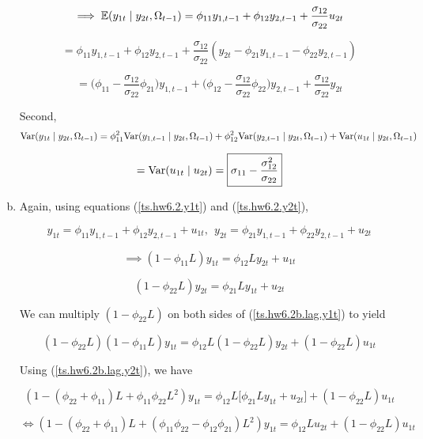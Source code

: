 \begin{enumerate}[(a)]
\[
\implies \mathbb{E}(y_{1t} \mid y_{2t}, \Omega_{t-1})  =  \phi_{11} y_{1,t-1} + \phi_{12} y_{2, t-1} + \frac{\sigma_{12}}{\sigma_{22}} u_{2t}
\]

\[
=  \phi_{11} y_{1,t-1} + \phi_{12} y_{2, t-1} + \frac{\sigma_{12}}{\sigma_{22}}( y_{2t} - \phi_{21}y_{1,t-1} - \phi_{22} y_{2,t-1})
\]

\[
= \boxed{ \bigg( \phi_{11}  - \frac{\sigma_{12}}{\sigma_{22}}\phi_{21} \bigg) y_{1,t-1} + \bigg(\phi_{12} -   \frac{\sigma_{12}}{\sigma_{22}} \phi_{22} \bigg) y_{2, t-1} + \frac{\sigma_{12}}{\sigma_{22}} y_{2t} }
\]



Second,
\[
\mathrm{Var}(y_{1t} \mid y_{2t}, \Omega_{t-1}) = \phi_{11}^2 \mathrm{Var}( y_{1,t-1} \mid y_{2t}, \Omega_{t-1}) + \phi_{12}^2 \mathrm{Var}( y_{2, t-1}\mid y_{2t}, \Omega_{t-1} ) + \mathrm{Var}(u_{1t} \mid y_{2t}, \Omega_{t-1}) 
\]

\[
= \mathrm{Var}(u_{1t} \mid u_{2t})  = \boxed{\sigma_{11} - \frac{\sigma_{12}^2}{\sigma_{22}}}
\]

\item

Again, using equations (\ref{ts.hw6.2.y1t}) and (\ref{ts.hw6.2.y2t}),

\[
y_{1t} = \phi_{11} y_{1,t-1} + \phi_{12} y_{2, t-1} + u_{1t}, \ \ y_{2t} = \phi_{21} y_{1,t-1} + \phi_{22} y_{2, t-1} + u_{2t}
\]

\begin{equation}\label{ts.hw6.2b.lag.y1t}
\implies (1 - \phi_{11}L)y_{1t} = \phi_{12}  L y_{2t} + u_{1t}
\end{equation}

\begin{equation}\label{ts.hw6.2b.lag.y2t}
 (1 - \phi_{22}L)y_{2t} = \phi_{21}  L y_{1t} + u_{2t}
 \end{equation}

We can multiply \( (1 - \phi_{22}L)\) on both sides of (\ref{ts.hw6.2b.lag.y1t}) to yield

\[
(1 - \phi_{22}L)(1 - \phi_{11}L)y_{1t} = \phi_{12} L(1 - \phi_{22}L)  y_{2t} + (1 - \phi_{22}L)u_{1t}
\]

Using (\ref{ts.hw6.2b.lag.y2t}), we have

\[
(1 - (\phi_{22} + \phi_{11})L+ \phi_{11}\phi_{22}L^2)y_{1t} = \phi_{12}L \big[  \phi_{21}  L y_{1t} + u_{2t} \big]+ (1 - \phi_{22}L)u_{1t}
\]

\begin{equation}\label{ts.hw6.2b.arma}
\iff (1 - (\phi_{22} + \phi_{11})L+ (\phi_{11}\phi_{22} - \phi_{12}\phi_{21}) L^2)y_{1t} = \phi_{12}L u_{2t} + (1 - \phi_{22}L)u_{1t}
\end{equation}


\end{enumerate}
